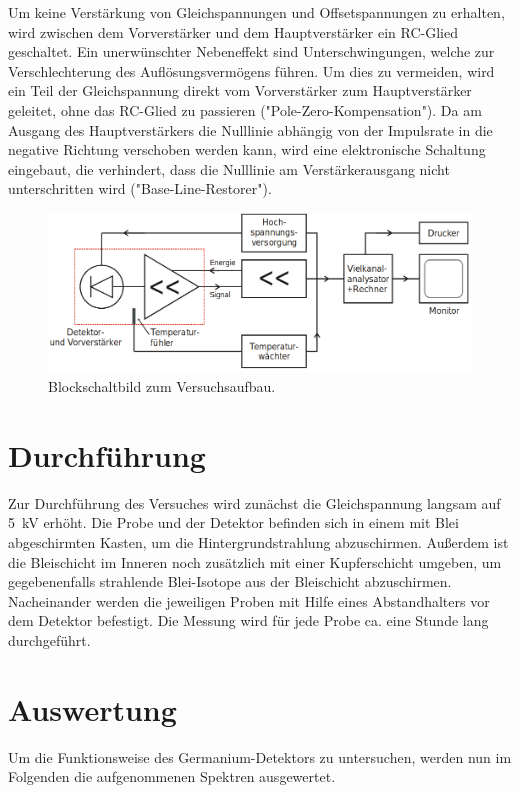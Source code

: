 Um keine Verstärkung von Gleichspannungen und Offsetspannungen zu erhalten, wird
zwischen dem Vorverstärker und dem Hauptverstärker ein RC-Glied geschaltet. Ein
unerwünschter Nebeneffekt sind Unterschwingungen, welche zur Verschlechterung
des Auflösungsvermögens führen. Um dies zu vermeiden, wird ein Teil der
Gleichspannung direkt vom Vorverstärker zum Hauptverstärker geleitet, ohne das
RC-Glied zu passieren ("Pole-Zero-Kompensation").
Da am Ausgang des Hauptverstärkers die Nulllinie abhängig von der Impulsrate in
die negative Richtung verschoben werden kann, wird eine elektronische Schaltung
eingebaut, die verhindert, dass die Nulllinie am Verstärkerausgang nicht
unterschritten wird ("Base-Line-Restorer").

\begin{figure}
  \centering
  \includegraphics[scale=0.4]{Aufbau.png}
  \caption{Blockschaltbild zum Versuchsaufbau. \cite{Q1}}
  \label{abb:2}
\end{figure}



\section{Durchführung}
Zur Durchführung des Versuches wird zunächst die Gleichspannung langsam auf \SI{5}{\kilo\volt}
erhöht.
Die Probe und der Detektor befinden sich in einem mit Blei abgeschirmten Kasten,
um die Hintergrundstrahlung abzuschirmen. Außerdem ist die Bleischicht im Inneren
noch zusätzlich mit einer Kupferschicht umgeben, um gegebenenfalls strahlende
Blei-Isotope aus der Bleischicht abzuschirmen.
Nacheinander werden die jeweiligen Proben mit Hilfe eines Abstandhalters
vor dem Detektor befestigt. Die Messung wird für jede Probe ca. eine Stunde lang
durchgeführt.

\section{Auswertung}
Um die Funktionsweise des Germanium-Detektors zu untersuchen, werden nun im Folgenden die aufgenommenen
Spektren ausgewertet.


